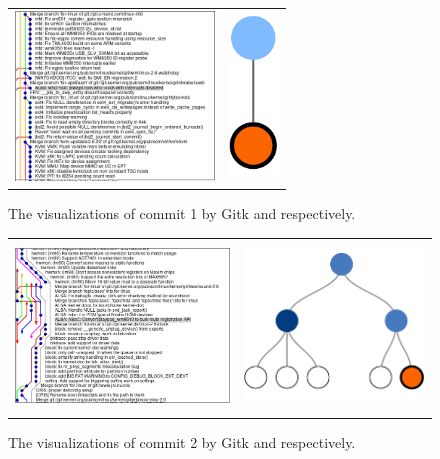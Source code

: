 \begin{figure}[htpb]
  \centering
  \begin{tabular}{cc}
    \includegraphics[height=4.5cm]{Figures/evaluation/commit1_gitk.png} &
    \includegraphics[height=4.5cm]{Figures/evaluation/commit1_linvis.pdf}
  \end{tabular}
  \caption{The visualizations of commit 1 by Gitk and \tool{}
    respectively.}
  \label{fig:commit_1_visualization}
\end{figure}

\begin{figure}[htpb]
  \centering
  \begin{tabular}{cc}
    \includegraphics[height=4.5cm]{Figures/evaluation/commit2_gitk.png} &
    \includegraphics[height=4.5cm]{Figures/evaluation/commit2_linvis.pdf}
  \end{tabular}
  \caption{The visualizations of commit 2 by Gitk and \tool{}
    respectively.}
  \label{fig:commit_2_visualization}
\end{figure}

